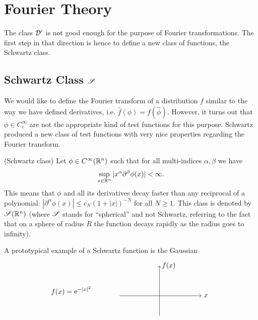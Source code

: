 \documentclass[11pt]{article}
\begin{document}
	\section{Fourier Theory}

		The class $\mathcal{D}^\prime$ is not good enough for the purpose of Fourier transformations. The first step in that direction is hence to define a new class of functions, the Schwartz class.

		\subsection{Schwartz Class $\mathscr{S}$}

			We would like to define the Fourier transform of a distribution $f$ similar to the way we have defined derivatives, i.e. $\hat{f}(\phi)=f(\hat{\phi})$. However, it turns out that $\phi\in C^\infty_c$ are not the appropriate kind of test functions for this purpose. Schwartz produced a new class of test functions with very nice properties regarding the Fourier transform.

			\begin{defi}
				(Schwartz class) Let $\phi\in C^\infty(\mathbb{R}^n)$ such that for all multi-indices $\alpha,\beta$ we have 
				\begin{equation*}
					\sup_{x\in\mathbb{R}^n}|x^\alpha\partial^\beta\phi(x)|<\infty.
				\end{equation*}
				This means that $\phi$ and all its derivatives decay faster than any reciprocal of a polynomial: $|\partial^\alpha\phi(x)|\le c_N(1+|x|)^{-N}$ for all $N\ge1$. This class is denoted by $\mathscr{S}(\mathbb{R}^n)$ (where $\mathscr{S}$ stands for ``spherical'' and not Schwartz, referring to the fact that on a sphere of radius $R$ the function decays rapidly as the radius goes to infinity).
			\end{defi}
	
			\begin{eg}
				A prototypical example of a Schwartz function is the Gaussian
				\begin{equation*}
					f(x)=\e{-|x|^2}\qquad\qquad
					\begin{tikzpicture}[baseline=.1cm]
						\draw[->] (-2,0)--(2.1,0) node [right]{$x$};
						\draw[->] (0,-1)--(0,1.5) node [right]{$f(x)$};
						\draw[line width=.5mm] plot [smooth] file {plots/gauss.table};
					\end{tikzpicture}
				\end{equation*}
			\end{eg}
\end{document}
